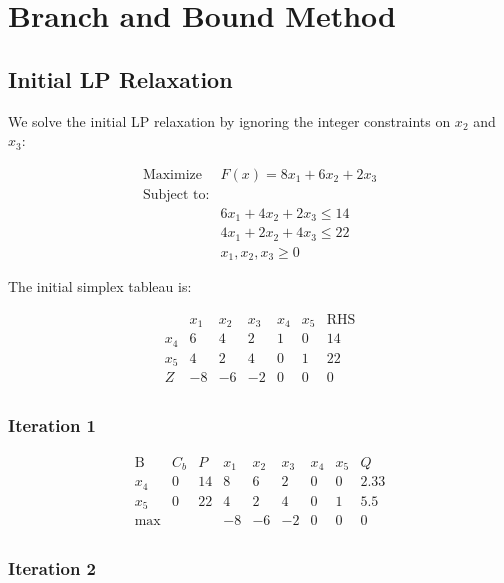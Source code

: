 \documentclass[12pt]{article}
\begin{document}
\section*{Branch and Bound Method}

\subsection*{Initial LP Relaxation}

We solve the initial LP relaxation by ignoring the integer constraints on \(x_2\) and \(x_3\):

\[
\begin{aligned}
\text{Maximize } & F(x) = 8x_1 + 6x_2 + 2x_3 \\
\text{Subject to:} \\
& 6x_1 + 4x_2 + 2x_3 \leq 14 \\
& 4x_1 + 2x_2 + 4x_3 \leq 22 \\
& x_1, x_2, x_3 \geq 0
\end{aligned}
\]

The initial simplex tableau is:

\[
\begin{array}{c|ccccc|c}
 & x_1 & x_2 & x_3 & x_4 & x_5 & \text{RHS} \\
\hline
x_4 & 6 & 4 & 2 & 1 & 0 & 14 \\
x_5 & 4 & 2 & 4 & 0 & 1 & 22 \\
\hline
Z & -8 & -6 & -2 & 0 & 0 & 0 \\
\end{array}
\]

\subsubsection*{Iteration 1}

\[
\begin{array}{c|ccccc|c}
\text{B} & C_b & P & x_1 & x_2 & x_3 & x_4 & x_5 & Q \\
\hline
x_4 & 0 & 14 & 8 & 6 & 2 & 0 & 0 & 2.33 \\
x_5 & 0 & 22 & 4 & 2 & 4 & 0 & 1 & 5.5 \\
\hline
\text{max} & & & -8 & -6 & -2 & 0 & 0 & 0 \\
\end{array}
\]

\subsubsection*{Iteration 2}
\end{document}
